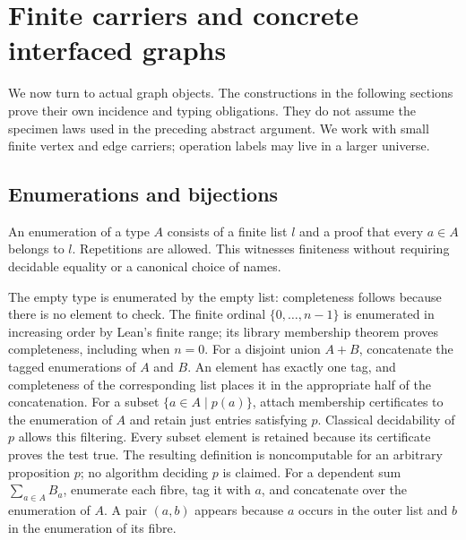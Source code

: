 \section{Finite carriers and concrete interfaced graphs}

We now turn to actual graph objects. The constructions in the following sections
prove their own incidence and typing obligations. They do not assume the specimen
laws used in the preceding abstract argument. We work with small finite vertex
and edge carriers; operation labels may live in a larger universe.

\subsection{Enumerations and bijections}
\begin{definition}\label{term:enumeration}
An enumeration of a type $A$ consists of a finite list $l$ and a proof that every
$a\in A$ belongs to $l$. Repetitions are allowed. This witnesses finiteness without
requiring decidable equality or a canonical choice of names.
\end{definition}
The empty type is enumerated by the empty list: completeness follows because
there is no element to check. The finite ordinal $\{0,\ldots,n-1\}$ is enumerated
in increasing order by Lean's finite range; its library membership theorem proves
completeness, including when $n=0$.
For a disjoint union $A+B$, concatenate the tagged enumerations of $A$ and $B$.
An element has exactly one tag, and completeness of the corresponding list places
it in the appropriate half of the concatenation.
For a subset $\{a\in A\mid p(a)\}$, attach membership certificates to the enumeration
of $A$ and retain just entries satisfying $p$. Classical decidability of $p$
allows this filtering. Every subset element is retained because its certificate
proves the test true. The resulting definition is noncomputable for an arbitrary
proposition $p$; no algorithm deciding $p$ is claimed.
For a dependent sum $\sum_{a\in A}B_a$, enumerate each fibre, tag it with $a$, and
concatenate over the enumeration of $A$. A pair $(a,b)$ appears because $a$ occurs
in the outer list and $b$ in the enumeration of its fibre.

